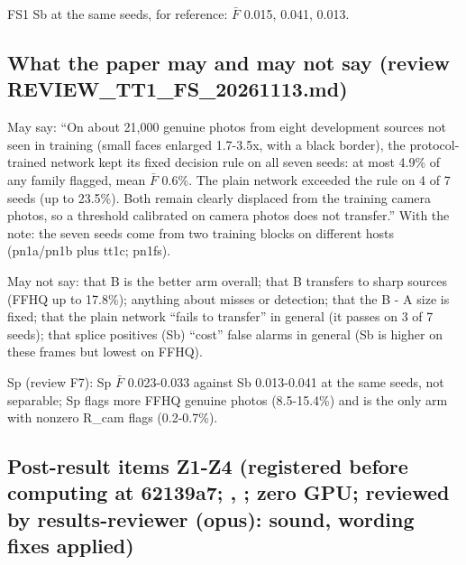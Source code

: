 \documentclass[10pt,twocolumn,letterpaper]{article}
\begin{document}
FS1 Sb at the same seeds, for reference: \(\bar F\) 0.015, 0.041, 0.013.

\subsection{What the paper may and may not say (review REVIEW\_TT1\_FS\_20261113.md)}\label{what-the-paper-may-and-may-not-say-review-review_tt1_fs_20261113.md}

May say: ``On about 21,000 genuine photos from eight development sources not seen in training (small faces enlarged 1.7-3.5x, with a black border), the protocol-trained network kept its fixed decision rule on all seven seeds: at most 4.9\% of any family flagged, mean \(\bar F\) 0.6\%. The plain network exceeded the rule on 4 of 7 seeds (up to 23.5\%). Both remain clearly displaced from the training camera photos, so a threshold calibrated on camera photos does not transfer.'' With the note: the seven seeds come from two training blocks on different hosts (pn1a/pn1b plus tt1c; pn1fs).

May not say: that B is the better arm overall; that B transfers to sharp sources (FFHQ up to 17.8\%); anything about misses or detection; that the B - A size is fixed; that the plain network ``fails to transfer'' in general (it passes on 3 of 7 seeds); that splice positives (Sb) ``cost'' false alarms in general (Sb is higher on these frames but lowest on FFHQ).

Sp (review F7): Sp \(\bar F\) 0.023-0.033 against Sb 0.013-0.041 at the same seeds, not separable; Sp flags more FFHQ genuine photos (8.5-15.4\%) and is the only arm with nonzero R\_cam flags (0.2-0.7\%).

\subsection{\texorpdfstring{Post-result items Z1-Z4 (registered before computing at 62139a7; \protect{}, \protect{}; zero GPU; reviewed by results-reviewer (opus): sound, wording fixes applied)}{Post-result items Z1-Z4 (registered before computing at 62139a7; , ; zero GPU; reviewed by results-reviewer (opus): sound, wording fixes applied)}}\label{post-result-items-z1-z4-registered-before-computing-at-62139a7-zero-gpu-reviewed-by-results-reviewer-opus-sound-wording-fixes-applied}
\end{document}

